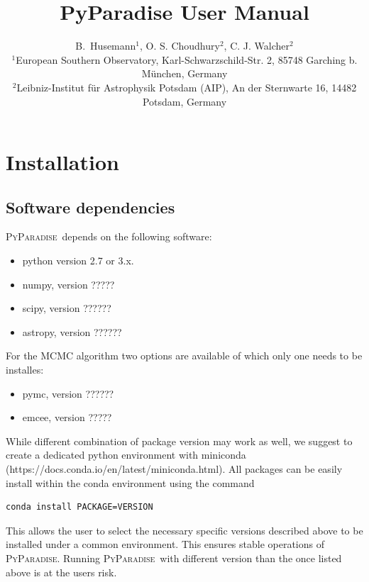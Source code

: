 \documentclass[usenatbib,usegraphicx,useAMS,onecolumn]{mn2e}
\newcommand{\PyPar}{\mbox{\textsc{PyParadise}}}
\begin{document}
\title{PyParadise User Manual}

\author[Husemann et al.]{B.~Husemann$^{1}$, O. S. Choudhury$^{2}$, C. J. Walcher$^{2}$\newauthor\\
$^1$European Southern Observatory, Karl-Schwarzschild-Str. 2, 85748 Garching b. M\"unchen, Germany\\
$^2$Leibniz-Institut f\"ur Astrophysik Potsdam (AIP), An der Sternwarte 16, 14482 Potsdam, Germany\\
}
\maketitle
\begin{abstract}

\end{abstract}

\section{Installation}
\label{sec:installation}
\subsection{Software dependencies}
\PyPar\ depends on the following software:
\begin{itemize}
    \item python version 2.7 or 3.x.
    \item numpy, version ????? 
    \item scipy, version ?????? 
    \item astropy, version ?????? 
\end{itemize}
For the MCMC algorithm two options are available of which only one needs to be installes:
\begin{itemize}
    \item pymc, version ??????
    \item emcee, version ?????
\end{itemize}

While different combination of package version may work as well, we suggest to create a dedicated python environment with miniconda (https://docs.conda.io/en/latest/miniconda.html). All packages can be easily install within the conda environment using the command 
\begin{lstlisting}[language=sh]
    conda install PACKAGE=VERSION
\end{lstlisting}
This allows the user to select the necessary specific versions described above to be installed under a common environment. This ensures stable operations of \PyPar. Running \PyPar\ with different version than the once listed above is at the users risk.
\end{document}
